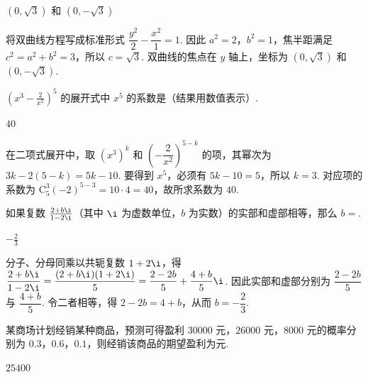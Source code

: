 \documentclass[UTF8,a4paper,oneside,11pt]{ctexbook}
\begin{document}
\begin{answer}
\((0,\sqrt{3})\) 和 \((0,-\sqrt{3})\)
\end{answer}

\begin{solution}
将双曲线方程写成标准形式
\(\dfrac{y^2}{2}-\dfrac{x^2}{1}=1\). 因此 \(a^2=2\)，\(b^2=1\)，焦半距满足 \(c^2=a^2+b^2=3\)，所以 \(c=\sqrt3\). 双曲线的焦点在 \(y\) 轴上，坐标为 \((0,\sqrt3)\) 和 \((0,-\sqrt3)\).
\end{solution}

\begin{problem}
\(\left(x^{3}-\frac{2}{x^{2}}\right)^{5} \) 的展开式中 \(x^{5} \) 的系数是（结果用数值表示）\fillinblank{}.
\end{problem}

\begin{answer}
\(40\)
\end{answer}

\begin{solution}
在二项式展开中，取 \(\left(x^3\right)^k\) 和 \(\left(-\dfrac{2}{x^2}\right)^{5-k}\) 的项，其幂次为
\(3k-2(5-k)=5k-10\). 要得到 \(x^5\)，必须有 \(5k-10=5\)，所以 \(k=3\). 对应项的系数为
\(\mathrm C_5^3(-2)^{5-3}=10\cdot4=40\)，故所求系数为 \(40\).
\end{solution}

\begin{problem}
如果复数 \(\frac{2+b\i}{1-2\i} \)（其中 \(\i\) 为虚数单位，\(b\) 为实数）的实部和虚部相等，那么 \(b=\)\fillinblank{}.
\end{problem}

\begin{answer}
\(-\frac{2}{3}\)
\end{answer}

\begin{solution}
分子、分母同乘以共轭复数 \(1+2\i\)，得
\(\dfrac{2+b\i}{1-2\i}=\dfrac{(2+b\i)(1+2\i)}{5}=\dfrac{2-2b}{5}+\dfrac{4+b}{5}\i\). 因此实部和虚部分别为 \(\dfrac{2-2b}{5}\) 与 \(\dfrac{4+b}{5}\). 令二者相等，得 \(2-2b=4+b\)，从而 \(b=-\dfrac23\).
\end{solution}

\begin{problem}
某商场计划经销某种商品，预测可得盈利 \(30000\) 元，\(26000\) 元，\(8000\) 元的概率分别为 \(0.3\)，\(0.6\)，\(0.1\)，则经销该商品的期望盈利为\fillinblank{}\(\text{元}\).
\end{problem}

\begin{answer}
\(25400\)
\end{answer}
\end{document}
